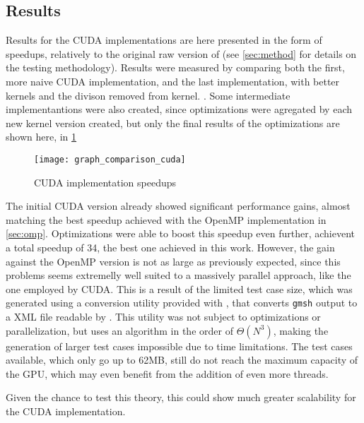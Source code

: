 \subsection{Results}
\label{subsec:cuda:results}

Results for the CUDA implementations are here presented in the form of speedups, relatively to the original raw version of \polu (see \cref{sec:method} for details on the testing methodology). Results were measured by comparing both the first, more naive CUDA implementation, and the last implementation, with better kernels and the divison removed from \update kernel. . Some intermediate implementantions were also created, since optimizations were agregated by each new kernel version created, but only the final results of the optimizations are shown here, in \cref{fig:cuda:results}

\begin{figure}[!htp]
	\centering
	\texttt{[image: graph\_comparison\_cuda]}
	\caption{CUDA implementation speedups}
	\label{fig:cuda:results}
\end{figure}

The initial CUDA version already showed significant performance gains, almost matching the best speedup achieved with the OpenMP implementation in \cref{sec:omp}. Optimizations were able to boost this speedup even further, achievent a total speedup of 34, the best one achieved in this work.
However, the gain against the OpenMP version is not as large as previously expected, since this problems seems extremelly well suited to a massively parallel approach, like the one employed by CUDA. This is a result of the limited test case size, which was generated using a conversion utility provided with \polu, that converts \texttt{gmsh} output to a XML file readable by \polu. This utility was not subject to optimizations or parallelization, but uses an algorithm in the order of $\Theta(N^3)$, making the generation of larger test cases impossible due to time limitations. The test cases available, which only go up to 62MB, still do not reach the maximum capacity of the GPU, which may even benefit from the addition of even more threads.

Given the chance to test this theory, this could show much greater scalability for the CUDA implementation.

